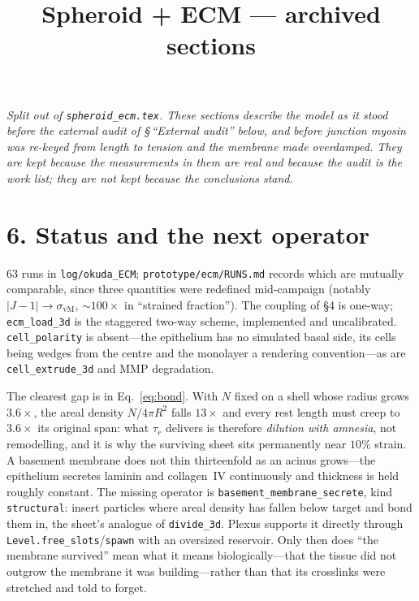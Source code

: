 \documentclass[10pt]{article}
\title{Spheroid + ECM --- archived sections}
\author{}\date{}
\newcommand{\op}[1]{\texttt{#1}}
\begin{document}
\maketitle

\noindent\emph{Split out of \texttt{spheroid\_ecm.tex}. These sections describe the model as it stood
before the external audit of \S\,``External audit'' below, and before junction myosin was re-keyed from
length to tension and the membrane made overdamped. They are kept because the measurements in them are
real and because the audit is the work list; they are not kept because the conclusions stand.}

\section*{6.\; Status and the next operator}

$63$ runs in \texttt{log/okuda\_ECM}; \texttt{prototype/ecm/RUNS.md} records which are mutually
comparable, since three quantities were redefined mid-campaign (notably $|J-1|\to\sigma_{\mathrm{vM}}$,
$\sim\!100\times$ in ``strained fraction''). The coupling of \S4 is one-way; \op{ecm\_load\_3d} is the
staggered two-way scheme, implemented and uncalibrated. \op{cell\_polarity} is absent---the epithelium
has no simulated basal side, its cells being wedges from the centre and the monolayer a rendering
convention---as are \op{cell\_extrude\_3d} and MMP degradation.

The clearest gap is in Eq.~\eqref{eq:bond}. With $N$ fixed on a shell whose radius grows $3.6\times$, the
areal density $N/4\pi R^2$ falls $13\times$ and every rest length must creep to $3.6\times$ its original
span: what $\tau_r$ delivers is therefore \emph{dilution with amnesia}, not remodelling, and it is why the
surviving sheet sits permanently near $10\%$ strain. A basement membrane does not thin thirteenfold as an
acinus grows---the epithelium secretes laminin and collagen~IV continuously and thickness is held roughly
constant. The missing operator is \op{basement\_membrane\_secrete}, kind \op{structural}: insert
particles where areal density has fallen below target and bond them in, the sheet's analogue of
\op{divide\_3d}. Plexus supports it directly through \texttt{Level.free\_slots}/\texttt{spawn} with an
oversized reservoir. Only then does ``the membrane survived'' mean what it means biologically---that the
tissue did not outgrow the membrane it was building---rather than that its crosslinks were stretched and
told to forget.
\end{document}
